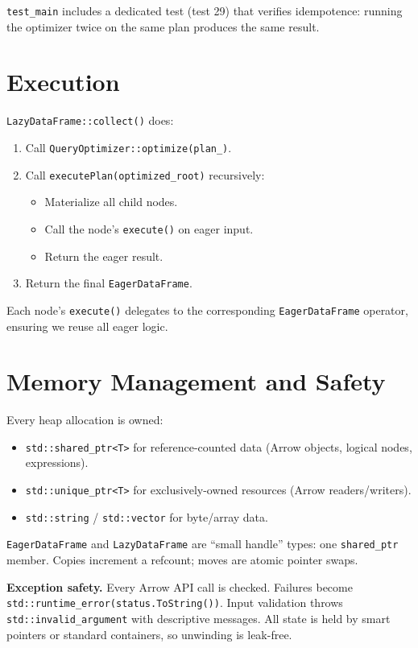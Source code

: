 \documentclass[11pt]{article}
\begin{document}
\texttt{test\_main} includes a dedicated test (test 29) that verifies 
idempotence: running the optimizer twice on the same plan produces the same 
result.

\section{Execution}

\texttt{LazyDataFrame::collect()} does:
\begin{enumerate}
  \item Call \texttt{QueryOptimizer::optimize(plan\_)}.
  \item Call \texttt{executePlan(optimized\_root)} recursively:
    \begin{itemize}
      \item Materialize all child nodes.
      \item Call the node's \texttt{execute()} on eager input.
      \item Return the eager result.
    \end{itemize}
  \item Return the final \texttt{EagerDataFrame}.
\end{enumerate}

Each node's \texttt{execute()} delegates to the corresponding 
\texttt{EagerDataFrame} operator, ensuring we reuse all eager logic.

\section{Memory Management and Safety}

Every heap allocation is owned:
\begin{itemize}
  \item \texttt{std::shared\_ptr<T>} for reference-counted data (Arrow objects, 
    logical nodes, expressions).
  \item \texttt{std::unique\_ptr<T>} for exclusively-owned resources (Arrow 
    readers/writers).
  \item \texttt{std::string} / \texttt{std::vector} for byte/array data.
\end{itemize}

\texttt{EagerDataFrame} and \texttt{LazyDataFrame} are ``small handle'' types: 
one \texttt{shared\_ptr} member. Copies increment a refcount; moves are atomic 
pointer swaps.

\textbf{Exception safety.} Every Arrow API call is checked. Failures become 
\texttt{std::runtime\_error(status.ToString())}. Input validation throws 
\texttt{std::invalid\_argument} with descriptive messages. All state is held 
by smart pointers or standard containers, so unwinding is leak-free.
\end{document}
